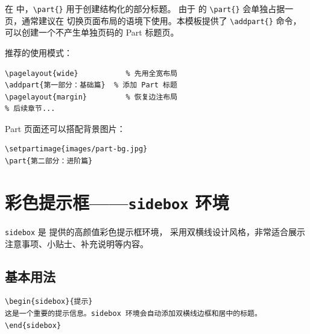 在  中，\lstinline|\part{}| 用于创建结构化的部分标题。
由于  的 \lstinline|\part{}| 会单独占据一页，通常建议在
切换页面布局的语境下使用。本模板提供了 \lstinline|\addpart{}| 命令，
可以创建一个不产生单独页码的 Part 标题页。

推荐的使用模式：
\begin{lstlisting}
\pagelayout{wide}           % 先用全宽布局
\addpart{第一部分：基础篇}  % 添加 Part 标题
\pagelayout{margin}         % 恢复边注布局
% 后续章节...

\end{lstlisting}

Part 页面还可以搭配背景图片：
\begin{lstlisting}
\setpartimage{images/part-bg.jpg}
\part{第二部分：进阶篇}
\end{lstlisting}


\section{彩色提示框——\texttt{sidebox} 环境}


\texttt{sidebox} 是  提供的高颜值彩色提示框环境，
采用双横线设计风格，非常适合展示注意事项、小贴士、补充说明等内容。

\subsection{基本用法}

\begin{lstlisting}
\begin{sidebox}{提示}
这是一个重要的提示信息。sidebox 环境会自动添加双横线边框和居中的标题。
\end{sidebox}
\end{lstlisting}

